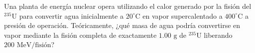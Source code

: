 \item Una planta de energía nuclear opera utilizando el calor generado por la fisión del $^{235}\text{U}$ para convertir agua inicialmente a $20^\circ\text{C}$ en vapor supercalentado a $400^\circ\text{C}$ a presión de operación. Teóricamente, ¿qué masa de agua podría convertirse en vapor mediante la fisión completa de exactamente $1.00\text{ g}$ de $^{235}\text{U}$ liberando $200\text{ MeV/fisión}$?